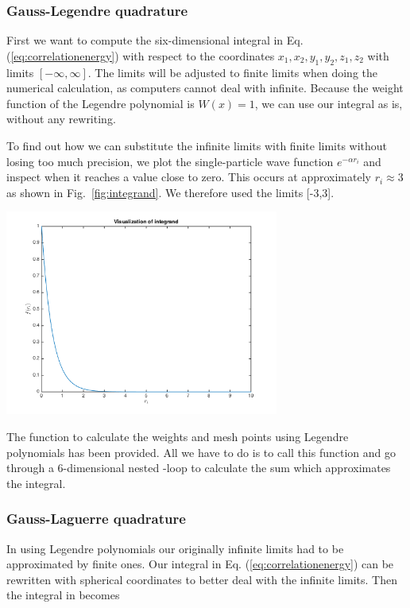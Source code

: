 \documentclass{article}
\begin{document}
\begin{multicols}{2}
\subsubsection{Gauss-Legendre quadrature}

First we want to compute the six-dimensional integral in Eq. (\ref{eq:correlationenergy}) with respect to the coordinates $x_1, x_2, y_1, y_2, z_1, z_2$ with limits $[-\infty, \infty]$. The limits will be adjusted to finite limits when doing the numerical calculation, as computers cannot deal with infinite. Because the weight function of the Legendre polynomial is $W(x) = 1$, we can use our integral as is, without any rewriting.

To find out how we can substitute the infinite limits with finite limits without losing too much precision, we plot the single-particle wave function $e^{-\alpha r_i}$ and inspect when it reaches a value close to zero. This occurs at approximately $r_i \approx 3$ as shown in Fig.~\ref{fig:integrand}. We therefore used the limits [-3,3].

\begin{center}
	\includegraphics[width=90mm]{integrand.png} 	
	\label{fig:integrand}
\end{center}
The function \verb@gauleg@ to calculate the weights and mesh points using Legendre polynomials has been provided. All we have to do is to call this function and go through a 6-dimensional nested \verb@for@-loop to calculate the sum which approximates the integral. 






\subsubsection{Gauss-Laguerre quadrature}
In using Legendre polynomials our originally infinite limits had to be approximated by finite ones. Our integral in Eq. (\ref{eq:correlationenergy}) can be rewritten with spherical coordinates to better deal with the infinite limits. Then the integral in becomes


\end{multicols}
\end{document}
